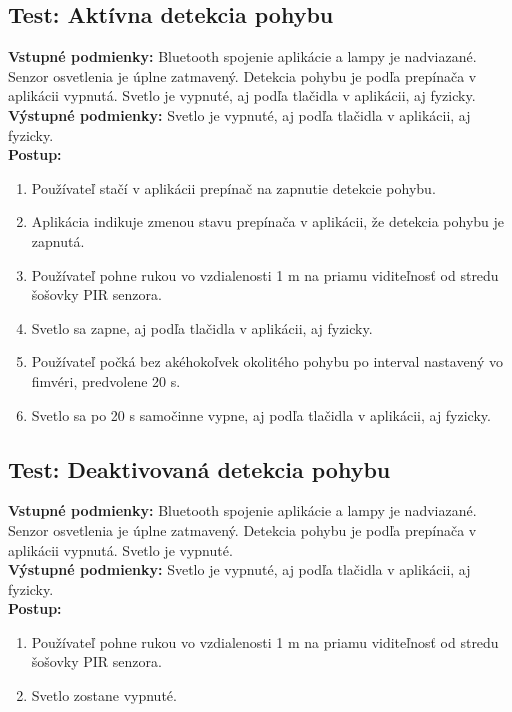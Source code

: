 \documentclass[12pt, a4paper]{article}
\begin{document}
\subsection{Test: Aktívna detekcia pohybu}
\noindent\textbf{Vstupné podmienky:} Bluetooth spojenie aplikácie a lampy je nadviazané. Senzor osvetlenia je úplne zatmavený. Detekcia pohybu je podľa prepínača v aplikácii vypnutá. Svetlo je vypnuté, aj podľa tlačidla v aplikácii, aj fyzicky. \\
\textbf{Výstupné podmienky:} Svetlo je vypnuté, aj podľa tlačidla v aplikácii, aj fyzicky. \\
\textbf{Postup:}
\begin{enumerate}
\itemsep0pt
\item Používateľ stačí v aplikácii prepínač na zapnutie detekcie pohybu.
\item Aplikácia indikuje zmenou stavu prepínača v aplikácii, že detekcia pohybu je zapnutá.
\item Používateľ pohne rukou vo vzdialenosti 1 m na priamu viditeľnosť od stredu šošovky PIR senzora.
\item Svetlo sa zapne, aj podľa tlačidla v aplikácii, aj fyzicky.
\item Používateľ počká bez akéhokoľvek okolitého pohybu po interval nastavený vo fimvéri, predvolene 20 s.
\item Svetlo sa po 20 s samočinne vypne, aj podľa tlačidla v aplikácii, aj fyzicky.
\end{enumerate}

\subsection{Test: Deaktivovaná detekcia pohybu}
\noindent\textbf{Vstupné podmienky:} Bluetooth spojenie aplikácie a lampy je nadviazané. Senzor osvetlenia je úplne zatmavený. Detekcia pohybu je podľa prepínača v aplikácii vypnutá. Svetlo je vypnuté. \\
\textbf{Výstupné podmienky:} Svetlo je vypnuté, aj podľa tlačidla v aplikácii, aj fyzicky. \\
\textbf{Postup:}
\begin{enumerate}
\itemsep0pt
\item Používateľ pohne rukou vo vzdialenosti 1 m na priamu viditeľnosť od stredu šošovky PIR senzora.
\item Svetlo zostane vypnuté.
\end{enumerate}
\end{document}
